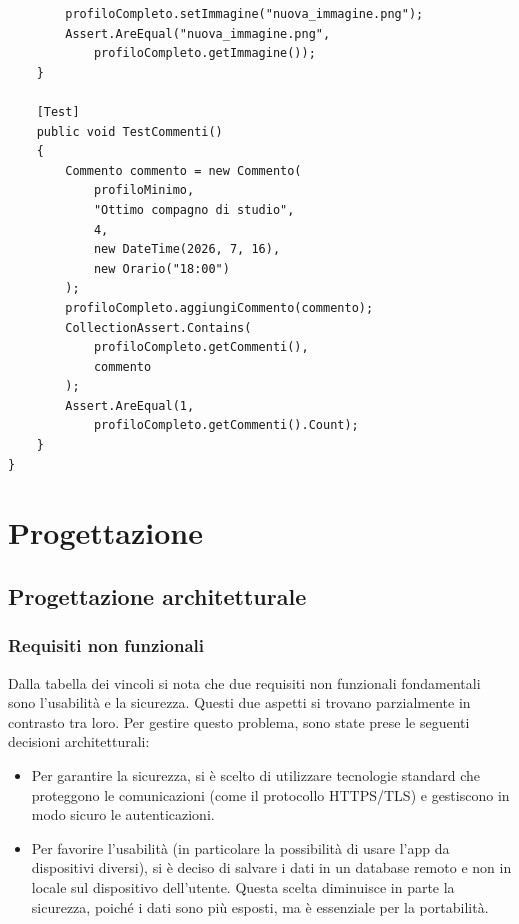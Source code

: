\documentclass[12pt,a4paper]{report}
\begin{document}
\begin{lstlisting}
        profiloCompleto.setImmagine("nuova_immagine.png");
        Assert.AreEqual("nuova_immagine.png",
            profiloCompleto.getImmagine());
    }

    [Test]
    public void TestCommenti()
    {
        Commento commento = new Commento(
            profiloMinimo,
            "Ottimo compagno di studio",
            4,
            new DateTime(2026, 7, 16),
            new Orario("18:00")
        );
        profiloCompleto.aggiungiCommento(commento);
        CollectionAssert.Contains(
            profiloCompleto.getCommenti(),
            commento
        );
        Assert.AreEqual(1,
            profiloCompleto.getCommenti().Count);
    }
}
\end{lstlisting}

\newpage
\chapter{Progettazione}

\section{Progettazione architetturale}

\subsection{Requisiti non funzionali}
Dalla tabella dei vincoli si nota che due requisiti non funzionali fondamentali sono l'usabilità e la sicurezza. Questi due aspetti si trovano parzialmente in contrasto tra loro.
Per gestire questo problema, sono state prese le seguenti decisioni architetturali:
\begin{itemize}
    \item Per garantire la sicurezza, si è scelto di utilizzare tecnologie standard che proteggono le comunicazioni (come il protocollo HTTPS/TLS) e gestiscono in modo sicuro le autenticazioni.
    \item Per favorire l'usabilità (in particolare la possibilità di usare l'app da dispositivi diversi), si è deciso di salvare i dati in un database remoto e non in locale sul dispositivo dell'utente. Questa scelta diminuisce in parte la sicurezza, poiché i dati sono più esposti, ma è essenziale per la portabilità.
\end{itemize}
\end{document}
